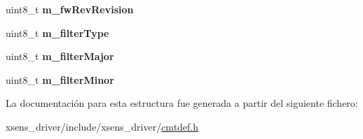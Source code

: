 \begin{DoxyCompactItemize}
\item 
\hypertarget{structCmtDeviceConfiguration_1_1__devInfo_a72695ccf7ad93c9699285dd55614cc39}{uint8\-\_\-t {\bfseries m\-\_\-fw\-Rev\-Revision}}\label{structCmtDeviceConfiguration_1_1__devInfo_a72695ccf7ad93c9699285dd55614cc39}

\item 
\hypertarget{structCmtDeviceConfiguration_1_1__devInfo_a5aa3abb6c8c87e18e55cc2d921b63ff8}{uint8\-\_\-t {\bfseries m\-\_\-filter\-Type}}\label{structCmtDeviceConfiguration_1_1__devInfo_a5aa3abb6c8c87e18e55cc2d921b63ff8}

\item 
\hypertarget{structCmtDeviceConfiguration_1_1__devInfo_a12ad1a4c1b088796786232170f64f341}{uint8\-\_\-t {\bfseries m\-\_\-filter\-Major}}\label{structCmtDeviceConfiguration_1_1__devInfo_a12ad1a4c1b088796786232170f64f341}

\item 
\hypertarget{structCmtDeviceConfiguration_1_1__devInfo_ae3ab46a02cef20706366989d644f95a6}{uint8\-\_\-t {\bfseries m\-\_\-filter\-Minor}}\label{structCmtDeviceConfiguration_1_1__devInfo_ae3ab46a02cef20706366989d644f95a6}

\end{DoxyCompactItemize}


\-La documentación para esta estructura fue generada a partir del siguiente fichero\-:\begin{DoxyCompactItemize}
\item 
xsens\-\_\-driver/include/xsens\-\_\-driver/\hyperlink{cmtdef_8h}{cmtdef.\-h}\end{DoxyCompactItemize}
